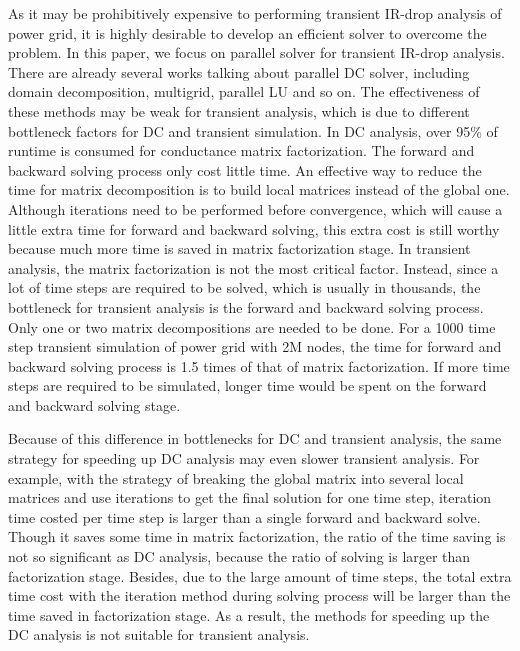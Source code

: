 As it may be prohibitively expensive to performing transient IR-drop analysis of power grid, it is highly desirable to develop an efficient solver to overcome the problem. In this paper, we focus on parallel solver for transient IR-drop analysis. There are already
several works talking about parallel DC solver, including domain decomposition\cite{PETSC_website, kaisun, voronov}, multigrid\cite{Zhuofeng,Kozhaya}, parallel LU\cite{Super_LU_website} and so on. The effectiveness of these methods may be weak for transient analysis, which is due to different bottleneck factors for DC and transient simulation. In DC analysis, over 95\% of runtime is consumed 
for conductance matrix factorization. The forward and backward solving process only cost little time. An effective way to reduce the time for 
matrix decomposition is to build local matrices instead of the global one. Although iterations need to be performed before convergence, which will cause a little extra time for forward and backward solving, this extra cost is still worthy because much more time is saved in matrix factorization stage. In transient analysis, the matrix factorization is not the most critical factor. Instead, since a lot of time steps are required to be solved, which is usually in thousands, the bottleneck for transient analysis is the forward and backward solving process. Only one or two matrix decompositions are needed to be done. For a 1000 time step transient simulation of power grid with 2M nodes, the time for 
forward and backward solving process is 1.5 times of that of matrix factorization. If more time steps are required to be simulated, longer time would be spent on the forward and backward solving stage.

Because of this difference in bottlenecks for DC and transient analysis, the same strategy for speeding up DC analysis may even slower transient analysis. For example, with the strategy of breaking the global matrix into several local matrices and use iterations to get the final solution for one time step, iteration time costed per time step is larger than a single forward and backward solve. Though it saves some time in matrix factorization, the ratio of the time saving is not so significant as DC analysis, because the ratio of solving is larger than factorization stage. Besides, due to the large amount of time steps, the total extra time cost with the iteration method during solving 
process will be larger than the time saved in factorization stage. As a result, the methods for speeding up the DC analysis is not suitable for transient analysis. 

